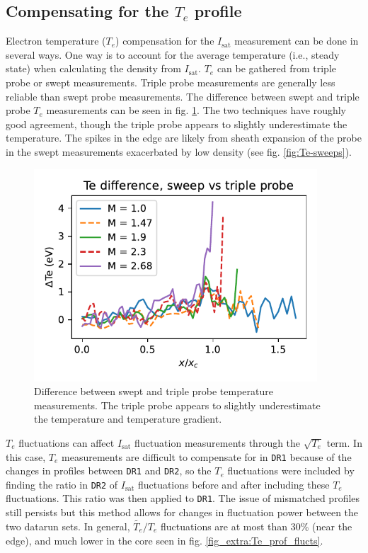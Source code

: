 \subsection{Compensating for the $T_e$ profile}

Electron temperature ($T_e$) compensation for the $I_\text{sat}$ measurement can be done in several ways. One way is to account for the average temperature (i.e., steady state) when calculating the density from $I_\text{sat}$. $T_e$ can be gathered from triple probe or swept measurements. Triple probe measurements are generally less reliable than swept probe measurements. The difference between swept and triple probe $T_e$ measurements can be seen in fig. \ref{fig:Te_swept_vs_triple}. The two techniques have roughly good agreement, though the triple probe appears to slightly underestimate the temperature. The spikes in the edge are likely from sheath expansion of the probe in the swept measurements exacerbated by low density \cite{tsui_accounting_2018} (see fig. \ref{fig:Te-sweeps}). 

\begin{figure}
    \centering
    \includegraphics[width=300pt]{figures/Te_sweep-TP_diff.pdf}
    \caption[Swept vs triple probe measurements]{Difference between swept and triple probe temperature measurements. The triple probe appears to slightly underestimate the temperature and temperature gradient. }
    \label{fig:Te_swept_vs_triple}
\end{figure}

$T_e$ fluctuations can affect $I_\text{sat}$ fluctuation measurements through the $\sqrt{T_e}$ term. In this case, $T_e$ measurements are difficult to compensate for in \texttt{DR1} because of the changes in profiles between \texttt{DR1} and \texttt{DR2}, so the $T_e$ fluctuations were included by finding the ratio in \texttt{DR2} of $I_\text{sat}$ fluctuations before and after including these $T_e$ fluctuations. This ratio was then applied to \texttt{DR1}. The issue of mismatched profiles still persists but this method allows for changes in fluctuation power between the two datarun sets. In general, $\widetilde{T_e} / T_e$ fluctuations are at most than 30\% (near the edge), and much lower in the core seen in fig. \ref{fig_extra:Te_prof_flucts}. 

